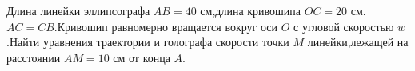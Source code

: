  Длина линейки эллипсографа $AB=40$ см,длина кривошипа $OC=20$ см.$AC=CB$.Кривошип равномерно вращается вокруг оси $O$ с
 угловой скоростью $w$.Найти уравнения траектории и голографа скорости точки $M$ линейки,лежащей на расстоянии $AM=10$ см от
 конца $A$.

